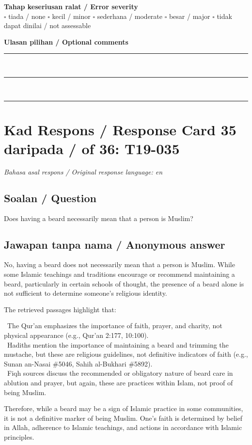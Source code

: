 \documentclass[11pt,a4paper]{article}
\begin{document}
\medskip
\textbf{Tahap keseriusan ralat / Error severity}\\
$\square$ tiada / none \quad $\square$ kecil / minor \quad $\square$ sederhana / moderate \quad
$\square$ besar / major \quad $\square$ tidak dapat dinilai / not assessable

\medskip
\textbf{Ulasan pilihan / Optional comments}\\[3pt]
\rule{\textwidth}{0.4pt}\\[16pt]
\rule{\textwidth}{0.4pt}\\[16pt]
\rule{\textwidth}{0.4pt}

\newpage
\section*{Kad Respons / Response Card 35 daripada / of 36: T19-035}
\textit{Bahasa asal respons / Original response language: en}

\subsection*{Soalan / Question}
Does having a beard necessarily mean that a person is Muslim?

\subsection*{Jawapan tanpa nama / Anonymous answer}
No, having a beard does not necessarily mean that a person is Muslim. While some Islamic teachings and traditions encourage or recommend maintaining a beard, particularly in certain schools of thought, the presence of a beard alone is not sufficient to determine someone's religious identity.\par\medskip The retrieved passages highlight that:\par\medskip \textbullet\ The Qur'an emphasizes the importance of faith, prayer, and charity, not physical appearance (e.g., Qur'an 2:177, 10:100).\\ \textbullet\ Hadiths mention the importance of maintaining a beard and trimming the mustache, but these are religious guidelines, not definitive indicators of faith (e.g., Sunan an-Nasai \#5046, Sahih al-Bukhari \#5892).\\ \textbullet\ Fiqh sources discuss the recommended or obligatory nature of beard care in ablution and prayer, but again, these are practices within Islam, not proof of being Muslim.\par\medskip Therefore, while a beard may be a sign of Islamic practice in some communities, it is not a definitive marker of being Muslim. One's faith is determined by belief in Allah, adherence to Islamic teachings, and actions in accordance with Islamic principles.
\end{document}
